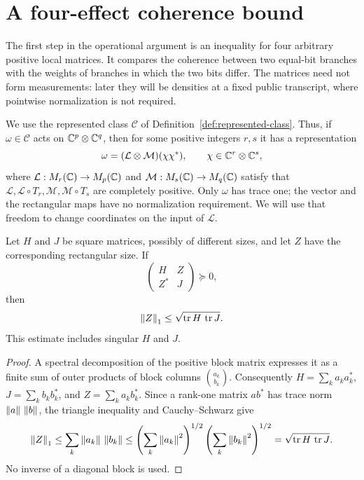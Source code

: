 \section{A four-effect coherence bound}
\label{sec:coherence}

The first step in the operational argument is an inequality for four
arbitrary positive local matrices.  It compares the coherence between
two equal-bit branches with the weights of branches in which the two
bits differ.  The matrices need not form measurements: later they will
be densities at a fixed public transcript, where pointwise
normalization is not required.

We use the represented class $\mathscr C$ of
Definition~\ref{def:represented-class}.  Thus, if $\omega\in\mathscr C$
acts on $\mathbb C^p\otimes\mathbb C^q$, then for some positive integers $r,s$ it has
a representation
\[
 \omega=(\mathcal L\otimes\mathcal M)(\chi\chi^*),
 \qquad
 \chi\in\mathbb C^r\otimes\mathbb C^s,
\]
where $\mathcal L:M_{r}(\mathbb C)\to M_{p}(\mathbb C)$ and
$\mathcal M:M_{s}(\mathbb C)\to M_{q}(\mathbb C)$ satisfy that
$\mathcal L,\mathcal L\circ T_r,\mathcal M,\mathcal M\circ T_s$
are completely positive.  Only $\omega$ has trace one; the vector and
the rectangular maps have no normalization requirement.  We will use
that freedom to change coordinates on the input of $\mathcal L$.

\begin{lemma}\label{lem:positive-block}
Let $H$ and $J$ be square matrices, possibly of different sizes, and
let $Z$ have the corresponding rectangular size.  If
\[
 \begin{pmatrix}H&Z\\ Z^*&J\end{pmatrix}\succeq0,
\]
then
\[
 \left\lVert Z\right\rVert_1\le\sqrt{\operatorname{tr} H\,\operatorname{tr} J}.
\]
This estimate includes singular $H$ and $J$.
\end{lemma}

\begin{proof}
A spectral decomposition of the positive block matrix expresses it as
a finite sum of outer products of block columns $\binom{a_k}{b_k}$.
Consequently
$H=\sum_k a_ka_k^*$, $J=\sum_k b_kb_k^*$, and
$Z=\sum_k a_kb_k^*$.  Since a rank-one matrix $ab^*$ has trace norm
$\left\lVert a\right\rVert\,\left\lVert b\right\rVert$, the triangle inequality and Cauchy--Schwarz give
\[
 \left\lVert Z\right\rVert_1
 \le\sum_k\left\lVert a_k\right\rVert\,\left\lVert b_k\right\rVert
 \le\left(\sum_k\left\lVert a_k\right\rVert^2\right)^{1/2}
      \left(\sum_k\left\lVert b_k\right\rVert^2\right)^{1/2}
 =\sqrt{\operatorname{tr} H\,\operatorname{tr} J}.
\]
No inverse of a diagonal block is used.
\end{proof}

